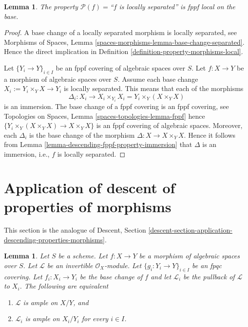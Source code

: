 \documentclass{stacks-project}
\theoremstyle{plain}
\newtheorem{lemma}[subsection]{Lemma}
\theoremstyle{definition}
\theoremstyle{remark}
\numberwithin{equation}{subsection}
\begin{document}
\begin{lemma}
\label{lemma-descending-fppf-property-locally-separated}
The property $\mathcal{P}(f) =$``$f$ is locally separated''
is fppf local on the base.
\end{lemma}

\begin{proof}
A base change of a locally separated morphism is locally separated, see
Morphisms of Spaces,
Lemma \ref{spaces-morphisms-lemma-base-change-separated}.
Hence the direct implication in
Definition \ref{definition-property-morphisms-local}.

\medskip\noindent
Let $\{Y_i \to Y\}_{i \in I}$ be an fppf covering of algebraic spaces over $S$.
Let $f : X \to Y$ be a morphism of algebraic spaces over $S$.
Assume each base change $X_i := Y_i \times_Y X \to Y_i$ is locally separated.
This means that each of the morphisms
$$
\Delta_i :
X_i
\longrightarrow
X_i \times_{Y_i} X_i = Y_i \times_Y (X \times_Y X)
$$
is an immersion. The base change of a fppf covering is an
fppf covering, see
Topologies on Spaces, Lemma \ref{spaces-topologies-lemma-fppf}
hence $\{Y_i \times_Y (X \times_Y X) \to X \times_Y X\}$
is an fppf covering of algebraic spaces. Moreover, each
$\Delta_i$ is the base change of the morphism
$\Delta : X \to X \times_Y X$. Hence it follows from
Lemma \ref{lemma-descending-fppf-property-immersion}
that $\Delta$ is an immersion, i.e., $f$ is locally separated.
\end{proof}





\section{Application of descent of properties of morphisms}
\label{section-application-descending-properties-morphisms}

\noindent
This section is the analogue of Descent, Section
\ref{descent-section-application-descending-properties-morphisms}.

\begin{lemma}
\label{lemma-descending-property-ample}
Let $S$ be a scheme.
Let $f : X \to Y$ be a morphism of algebraic spaces over $S$.
Let $\mathcal{L}$ be an invertible $\mathcal{O}_X$-module.
Let $\{g_i : Y_i \to Y\}_{i \in I}$ be an fpqc covering.
Let $f_i : X_i \to Y_i$ be the base change of $f$ and let $\mathcal{L}_i$
be the pullback of $\mathcal{L}$ to $X_i$.
The following are equivalent
\begin{enumerate}
\item $\mathcal{L}$ is ample on $X/Y$, and
\item $\mathcal{L}_i$ is ample on $X_i/Y_i$
for every $i \in I$.
\end{enumerate}
\end{lemma}
\end{document}
